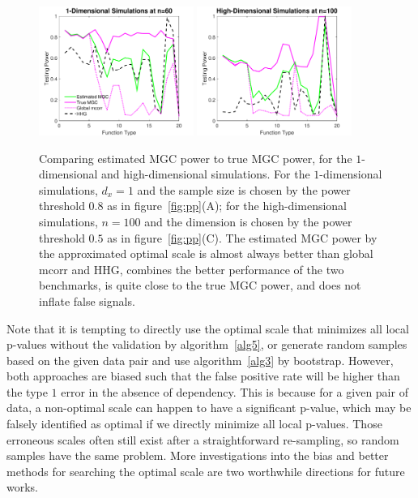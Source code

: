 \documentclass[11pt]{article}
\begin{document}
\begin{figure}[htbp]
\centering
\includegraphics[width=0.45\textwidth]{Figures/Fig9}
\includegraphics[width=0.45\textwidth]{Figures/Fig10}
\caption{Comparing estimated MGC power to true MGC power, for the $1$-dimensional and high-dimensional simulations. For the $1$-dimensional simulations, $d_{x}=1$ and the sample size is chosen by the power threshold $0.8$ as in figure~\ref{fig:pp}(A); for the high-dimensional simulations, $n=100$ and the dimension is chosen by the power threshold $0.5$ as in figure~\ref{fig:pp}(C). The estimated MGC power by the approximated optimal scale is almost always better than global mcorr and HHG, combines the better performance of the two benchmarks, is quite close to the true MGC power, and does not inflate false signals.} 
\label{figSimPerm}
\end{figure}

Note that it is tempting to directly use the optimal scale that minimizes all local p-values without the validation by algorithm~\ref{alg5}, or generate random samples based on the given data pair and use algorithm~\ref{alg3} by bootstrap. However, both approaches are biased such that the false positive rate will be higher than the type $1$ error in the absence of dependency. This is because for a given pair of data, a non-optimal scale can happen to have a significant p-value, which may be falsely identified as optimal if we directly minimize all local p-values. Those erroneous scales often still exist after a straightforward re-sampling, so random samples have the same problem. More investigations into the bias and better methods for searching the optimal scale are two worthwhile directions for future works.
\end{document}
